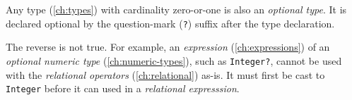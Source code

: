 Any type (\ref{ch:types}) with cardinality zero-or-one
is also an \emph{optional type}.
It is declared optional
by the question-mark (\verb|?|) suffix
after the type declaration.

The reverse is not true.
For example,
an \emph{expression} (\ref{ch:expressions})
of an \emph{optional numeric type} (\ref{ch:numeric-types}),
such as \verb|Integer?|,
cannot be used with the \emph{relational operators} (\ref{ch:relational}) as-is.
It must first be cast to \verb|Integer|
before it can used in a \emph{relational expresssion}.
